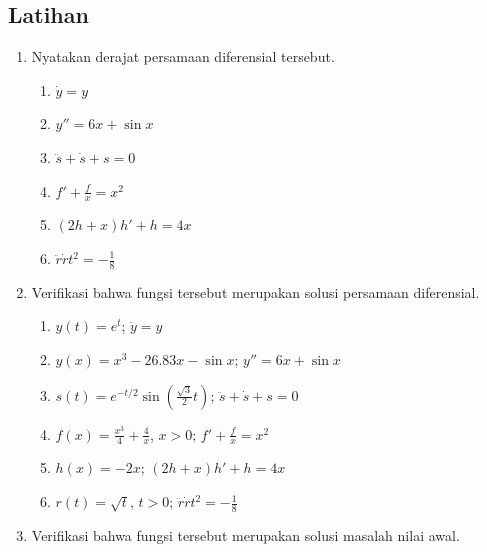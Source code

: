 \subsection{Latihan}
\begin{enumerate}
\item Nyatakan derajat persamaan diferensial tersebut.

\begin{enumerate}
\item \label{exc:odePendulum}$\dot{y}=y$ \hasananswer 
\item $y''=6x+\sin x$
\item \label{exc:odePendulum-1}$\ddot{s}+\dot{s}+s=0$ \hasananswer 
\item \label{exc:odePendulum-2}$f'+\frac{f}{x}=x^{2}$ \hasasolution 
\item $(2h+x)h'+h=4x$
\item \label{exc:odePendulum-3}$\ddot{r}\dot{r}t^{2}=-\frac{1}{8}$ \hasananswer 
\end{enumerate}
\item Verifikasi bahwa fungsi tersebut merupakan solusi persamaan diferensial.

\begin{enumerate}
\item \label{exc:odePendulum-4}$y(t)=e^{t}$; $\dot{y}=y$ \hasananswer 
\item $y(x)=x^{3}-26.83x-\sin x$; $y''=6x+\sin x$
\item \label{exc:odePendulum-5}$s(t)=e^{-t/2}\sin\left(\frac{\sqrt{3}}{2}t\right)$;
$\ddot{s}+\dot{s}+s=0$ \hasananswer 
\item \label{exc:odePendulum-6}$f(x)=\frac{x^{3}}{4}+\frac{4}{x}$, $x>0$;
$f'+\frac{f}{x}=x^{2}$ \hasasolution 
\item $h(x)=-2x$; $(2h+x)h'+h=4x$
\item \label{exc:odePendulum-7}$r(t)=\sqrt{t}$, $t>0$; $\ddot{r}\dot{r}t^{2}=-\frac{1}{8}$ \hasananswer 
\end{enumerate}
\item Verifikasi bahwa fungsi tersebut merupakan solusi masalah nilai awal.


\end{enumerate}
